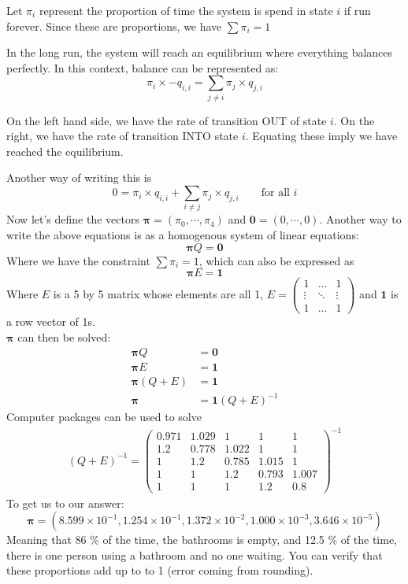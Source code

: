 Let $\pi_i$ represent the proportion of time the system is spend in state $i$ if run forever. Since these are proportions, we have $\sum\pi_i = 1$

In the long run, the system will reach an equilibrium where everything balances perfectly. In this context, balance can be represented as:
$$ \pi_i  \times -q_{i, i} = \sum_{j \neq i} \pi_j \times q_{j, i} $$

On the left hand side, we have the rate of transition OUT of state $ i $. On the right, we have the rate of transition INTO state $ i $. Equating these imply we have reached the equilibrium.

Another way of writing this is
$$ 0 = \pi_i  \times q_{i, i} + \sum_{i \neq j} \pi_j \times q_{j, i} \qquad \text{for all  }i$$
Now let's define the vectors $\boldsymbol{\pi}= (\pi_0, \cdots, \pi_4)$ and $\mathbf{0}= (0, \cdots, 0)$. Another way to write the above equations is as a homogenous system of linear equations:
$$ \boldsymbol{\pi}Q = \mathbf{0}$$
Where we have the constraint $ \sum\pi_i = 1 $, which can also be expressed as $$\boldsymbol{\pi} E = \mathbf{1} $$
Where $E$ is a 5 by 5 matrix whose elements are all 1, 
$E = \begin{pmatrix}
1		&	\dots	& 1\\
\vdots	&	\ddots	& \vdots\\
1		&	\dots	& 1

\end{pmatrix}
$ and $\mathbf{1} $ is a row vector of 1s.\\

$\boldsymbol{\pi}$ can then be solved:
\begin{align*}
	 \boldsymbol{\pi}Q &= \mathbf{0}\\
	 \boldsymbol{\pi} E &= \mathbf{1}\\
	 \boldsymbol{\pi} (Q + E) &= \mathbf{1}\\
	 \boldsymbol{\pi} & =  \mathbf{1}(Q+E)^{-1}
\end{align*}
Computer packages can be used to solve
\begin{align*}
	(Q+E)^{-1} = \begin{pmatrix}
	0.971	&	1.029	&	1 		& 1 		& 1	\\
	1.2  	&	0.778	& 1.022 	& 1 		& 1	\\
	1  		&	1.2		&0.785		&1.015 		& 1	\\
	1  		&	1		&	1.2 	&0.793		& 1.007\\
	1		&	1		&	1		& 1.2 		& 0.8
	\end{pmatrix}^{-1}
\end{align*}
To get us to our answer:
$$ \boldsymbol{\pi} = ( 8.599\times 10^{-1}, 1.254\times 10^{-1}, 1.372\times 10^{-2}, 1.000\times 10^{-3}, 3.646\times 10^{-5}) $$
Meaning that 86 \% of the time, the bathrooms is empty, and 12.5 \% of the time, there is one person using a bathroom and no one waiting. You can verify that these proportions add up to to 1 (error coming from rounding).

